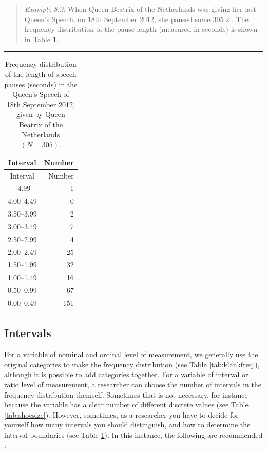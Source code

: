 \documentclass[
]{book}
\begin{document}
\begin{quote}
\emph{Example 8.2}: When Queen Beatrix of the Netherlands was giving her last Queen's Speech,
on 18th September 2012, she paused some \(305\times\). The frequency distribution
of the pause length (measured in seconds) is shown in
Table \ref{tab:queensspeech2012pauses}.
\end{quote}

\begin{center}\rule{0.5\linewidth}{0.5pt}\end{center}

\begin{longtable}[]{@{}cr@{}}
\caption{\label{tab:queensspeech2012pauses} Frequency distribution of the length of speech pauses (seconds)
in the Queen's Speech of 18th September 2012, given by Queen Beatrix of the Netherlands
\((N=305)\).}\tabularnewline
\toprule\noalign{}
Interval & Number \\
\midrule\noalign{}
\endfirsthead
\toprule\noalign{}
Interval & Number \\
\midrule\noalign{}
\endhead
\bottomrule\noalign{}
\endlastfoot
4.50--4.99 & 1 \\
4.00--4.49 & 0 \\
3.50--3.99 & 2 \\
3.00--3.49 & 7 \\
2.50--2.99 & 4 \\
2.00--2.49 & 25 \\
1.50--1.99 & 32 \\
1.00--1.49 & 16 \\
0.50--0.99 & 67 \\
0.00--0.49 & 151 \\
\end{longtable}

\subsection{Intervals}\label{sec:intervals}

For a variable of nominal and ordinal level of measurement, we generally
use the original categories to make the frequency distribution
(see Table \ref{tab:klankfreq}), although it is possible to add categories
together. For a variable of interval or ratio level of measurement, a
researcher can choose the number of intervals in the frequency distribution
themself. Sometimes that is not necessary, for instance because the variable has
a clear number of different discrete values (see Table \ref{tab:shoesize}).
However, sometimes, as a researcher you have to decide for yourself how many
intervals you should distinguish, and how to determine the
interval boundaries (see Table \ref{tab:queensspeech2012pauses}).
In this instance, the following are recommended \citep[Ch.2]{Ferg89}:
\end{document}
